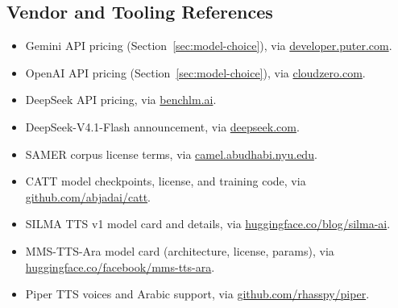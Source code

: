 \documentclass[11pt,a4paper]{article}
\begin{document}
\subsection*{Vendor and Tooling References}
\begin{itemize}[leftmargin=1.4em]
\item Gemini API pricing (Section~\ref{sec:model-choice}), via
\href{https://developer.puter.com/tutorials/gemini-api-pricing/}{developer.puter.com}.
\item OpenAI API pricing (Section~\ref{sec:model-choice}), via
\href{https://www.cloudzero.com/blog/openai-pricing/}{cloudzero.com}.
\item DeepSeek API pricing, via
\href{https://benchlm.ai/deepseek/api-pricing}{benchlm.ai}.
\item DeepSeek-V4.1-Flash announcement, via
\href{https://www.deepseek.com/en/news/deepseek-v4-1-flash/}{deepseek.com}.
\item SAMER corpus license terms, via
\href{https://camel.abudhabi.nyu.edu/samer-simplification-corpus/}{camel.abudhabi.nyu.edu}.
\item CATT model checkpoints, license, and training code, via
\href{https://github.com/abjadai/catt}{github.com/abjadai/catt}.
\item SILMA TTS v1 model card and details, via
\href{https://huggingface.co/blog/silma-ai/opensource-arabic-english-text-to-speech-model}{huggingface.co/blog/silma-ai}.
\item MMS-TTS-Ara model card (architecture, license, params), via
\href{https://huggingface.co/facebook/mms-tts-ara}{huggingface.co/facebook/mms-tts-ara}.
\item Piper TTS voices and Arabic support, via
\href{https://github.com/rhasspy/piper}{github.com/rhasspy/piper}.
\end{itemize}
\end{document}
